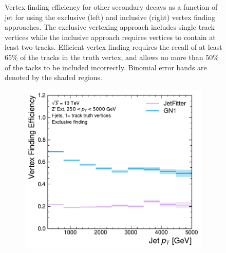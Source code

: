 \begin{figure}[!htbp]
\begin{subfigure}[b]{0.48\textwidth}
    \end{subfigure}
    \caption{
        Vertex finding efficiency for other secondary decays as a function of jet \pt for \ttbarljets using the exclusive (left) and inclusive (right) vertex finding approaches.
        The exclusive vertexing approach includes single track vertices while the inclusive approach requires vertices to contain at least two tracks.
        Efficient vertex finding requires the recall of at least $65\%$ of the tracks in the truth vertex, and allows no more than $50\%$ of the tacks to be included incorrectly.
        Binomial error bands are denoted by the shaded regions.
    }
    \label{fig:ttbar_vert_leff}
\end{figure}

\begin{figure}[!htbp]
    \centering
    \begin{subfigure}[b]{0.48\textwidth}
        \centering
        \includegraphics[width=\textwidth]{chapters/gnn_tagger/figs/results/tracks/zprime/zprime_ljet_vert_eff_1+_track_excl.pdf}
    \end{subfigure}
    \quad
    \begin{subfigure}[b]{0.48\textwidth}
        \centering

\end{subfigure}
\end{figure}
